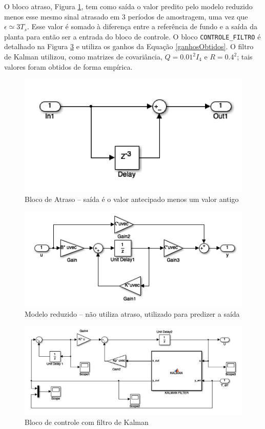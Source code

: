  O bloco atraso, Figura \ref{blocoAtraso}, tem como saída o valor predito pelo modelo reduzido menos esse mesmo sinal atrasado em 3 períodos de amostragem, uma vez que $\epsilon \simeq 3T_s$. Esse valor é somado à diferença entre a referência de fundo e a saída da planta para então ser a entrada do bloco de controle. O bloco \texttt{CONTROLE\_FILTRO} é detalhado na Figura \ref{blocoControle} e utiliza os ganhos da Equação \ref{ganhosObtidos}. O filtro de Kalman utilizou, como matrizes de covariância, $Q = 0.01^2 I_4$ e $R = 0.4^2$; tais valores foram obtidos de forma empírica.

\begin{figure}[!ht]
\centering

\includegraphics[width=0.5\linewidth]{figs/resultados/simulink/atraso}
\caption{Bloco de Atraso -- saída é o valor antecipado menos um valor antigo\label{blocoAtraso}}
\end{figure}

\begin{figure}[!ht]
\centering

\includegraphics[width=0.6\linewidth]{figs/resultados/simulink/modeloReduzido}
\caption{Modelo reduzido -- não utiliza atraso, utilizado para predizer a saída\label{blocoModeloReduzido}}
\end{figure}

\begin{figure}[!ht]
\centering
\includegraphics[width=0.9\linewidth]{figs/resultados/simulink/controle}
\caption{Bloco de controle com filtro de Kalman\label{blocoControle}}

\end{figure}

